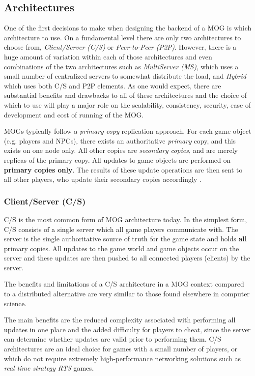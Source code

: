 \subsection{Architectures}
One of the first decisions to make when designing the backend of a MOG is which architecture to use. On a fundamental level there are only two architectures to choose from, \textit{Client/Server (C/S)} or \textit{Peer-to-Peer (P2P)}. However, there is a huge amount of variation within each of those architectures and even combinations of the two architectures such as \textit{MultiServer (MS)}, which uses a small number of centralized servers to somewhat distribute the load, and \textit{Hybrid} which uses both C/S and P2P elements. As one would expect, there are substantial benefits and drawbacks to all of these architectures and the choice of which to use will play a major role on the scalability, consistency, security, ease of development and cost of running of the MOG. 

MOGs typically follow a \textit{primary copy} replication approach. For each game object (e.g. players and NPCs), there exists an authoritative \textit{primary} copy, and this exists on one node only. All other copies are \textit{secondary copies}, and are merely replicas of the primary copy. All updates to game objects are performed on \textbf{primary copies only}. The results of these update operations are then sent to all other players, who update their secondary copies accordingly \cite{p2p-mog-survey}.

\subsubsection*{Client/Server (C/S)}
C/S is the most common form of MOG architecture today. In the simplest form, C/S consists of a single server which all game players communicate with. The server is the single authoritative source of truth for the game state and holds \textbf{all} primary copies. All updates to the game world and game objects occur on the server and these updates are then pushed to all connected players (clients) by the server.

The benefits and limitations of a C/S architecture in a MOG context compared to a distributed alternative are very similar to those found elsewhere in computer science. 

The main benefits are the reduced complexity associated with performing all updates in one place and the added difficulty for players to cheat, since the server can determine whether updates are valid prior to performing them. C/S architectures are an ideal choice for games with a small number of players, or which do not require extremely high-performance networking solutions such as \textit{real time strategy RTS} games. 

